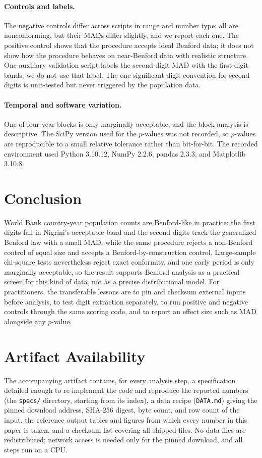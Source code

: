 \documentclass[sigconf,nonacm]{acmart}
\begin{document}
\paragraph{Controls and labels.} The negative controls differ across scripts in range and number type; all are nonconforming, but their MADs differ slightly, and we report each one. The positive control shows that the procedure accepts ideal Benford data; it does not show how the procedure behaves on near-Benford data with realistic structure. One auxiliary validation script labels the second-digit MAD with the first-digit bands; we do not use that label. The one-significant-digit convention for second digits is unit-tested but never triggered by the population data.

\paragraph{Temporal and software variation.} One of four year blocks is only marginally acceptable, and the block analysis is descriptive. The SciPy version used for the \(p\)-values was not recorded, so \(p\)-values are reproducible to a small relative tolerance rather than bit-for-bit. The recorded environment used Python 3.10.12, NumPy 2.2.6, pandas 2.3.3, and Matplotlib 3.10.8.

\section{Conclusion}
World Bank country-year population counts are Benford-like in practice: the first digits fall in Nigrini's acceptable band and the second digits track the generalized Benford law with a small MAD, while the same procedure rejects a non-Benford control of equal size and accepts a Benford-by-construction control. Large-sample chi-square tests nevertheless reject exact conformity, and one early period is only marginally acceptable, so the result supports Benford analysis as a practical screen for this kind of data, not as a precise distributional model. For practitioners, the transferable lessons are to pin and checksum external inputs before analysis, to test digit extraction separately, to run positive and negative controls through the same scoring code, and to report an effect size such as MAD alongside any \(p\)-value.

\section*{Artifact Availability}
The accompanying artifact contains, for every analysis step, a specification detailed enough to re-implement the code and reproduce the reported numbers (the \texttt{specs/} directory, starting from its index), a data recipe (\texttt{DATA.md}) giving the pinned download address, SHA-256 digest, byte count, and row count of the input, the reference output tables and figures from which every number in this paper is taken, and a checksum list covering all shipped files. No data files are redistributed; network access is needed only for the pinned download, and all steps run on a CPU.



\end{document}
